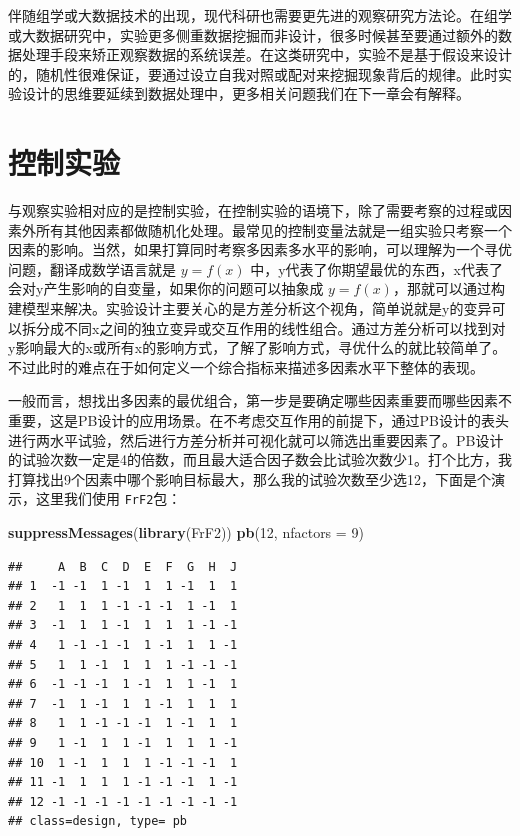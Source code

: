 \documentclass[]{tufte-book}
\newenvironment{Shaded}{}{}
\newcommand{\DataTypeTok}[1]{\textcolor[rgb]{0.56,0.13,0.00}{#1}}
\newcommand{\DecValTok}[1]{\textcolor[rgb]{0.25,0.63,0.44}{#1}}
\newcommand{\KeywordTok}[1]{\textcolor[rgb]{0.00,0.44,0.13}{\textbf{#1}}}
\newcommand{\NormalTok}[1]{#1}
\begin{document}
伴随组学或大数据技术的出现，现代科研也需要更先进的观察研究方法论。在组学或大数据研究中，实验更多侧重数据挖掘而非设计，很多时候甚至要通过额外的数据处理手段来矫正观察数据的系统误差。在这类研究中，实验不是基于假设来设计的，随机性很难保证，要通过设立自我对照或配对来挖掘现象背后的规律。此时实验设计的思维要延续到数据处理中，更多相关问题我们在下一章会有解释。

\hypertarget{ux63a7ux5236ux5b9eux9a8c}{%
\section{控制实验}\label{ux63a7ux5236ux5b9eux9a8c}}

与观察实验相对应的是控制实验，在控制实验的语境下，除了需要考察的过程或因素外所有其他因素都做随机化处理。最常见的控制变量法就是一组实验只考察一个因素的影响。当然，如果打算同时考察多因素多水平的影响，可以理解为一个寻优问题，翻译成数学语言就是 \(y = f(x)\) 中，y代表了你期望最优的东西，x代表了会对y产生影响的自变量，如果你的问题可以抽象成 \(y = f(x)\)，那就可以通过构建模型来解决。实验设计主要关心的是方差分析这个视角，简单说就是y的变异可以拆分成不同x之间的独立变异或交互作用的线性组合。通过方差分析可以找到对y影响最大的x或所有x的影响方式，了解了影响方式，寻优什么的就比较简单了。不过此时的难点在于如何定义一个综合指标来描述多因素水平下整体的表现。

一般而言，想找出多因素的最优组合，第一步是要确定哪些因素重要而哪些因素不重要，这是PB设计的应用场景。在不考虑交互作用的前提下，通过PB设计的表头进行两水平试验，然后进行方差分析并可视化就可以筛选出重要因素了。PB设计的试验次数一定是4的倍数，而且最大适合因子数会比试验次数少1。打个比方，我打算找出9个因素中哪个影响目标最大，那么我的试验次数至少选12，下面是个演示，这里我们使用 \texttt{FrF2}包：

\begin{Shaded}
\begin{Highlighting}[]
\KeywordTok{suppressMessages}\NormalTok{(}\KeywordTok{library}\NormalTok{(FrF2))}
\KeywordTok{pb}\NormalTok{(}\DecValTok{12}\NormalTok{, }\DataTypeTok{nfactors =} \DecValTok{9}\NormalTok{)}
\end{Highlighting}
\end{Shaded}

\begin{verbatim}
##     A  B  C  D  E  F  G  H  J
## 1  -1 -1  1 -1  1  1 -1  1  1
## 2   1  1  1 -1 -1 -1  1 -1  1
## 3  -1  1  1 -1  1  1  1 -1 -1
## 4   1 -1 -1 -1  1 -1  1  1 -1
## 5   1  1 -1  1  1  1 -1 -1 -1
## 6  -1 -1 -1  1 -1  1  1 -1  1
## 7  -1  1 -1  1  1 -1  1  1  1
## 8   1  1 -1 -1 -1  1 -1  1  1
## 9   1 -1  1  1 -1  1  1  1 -1
## 10  1 -1  1  1  1 -1 -1 -1  1
## 11 -1  1  1  1 -1 -1 -1  1 -1
## 12 -1 -1 -1 -1 -1 -1 -1 -1 -1
## class=design, type= pb
\end{verbatim}
\end{document}
